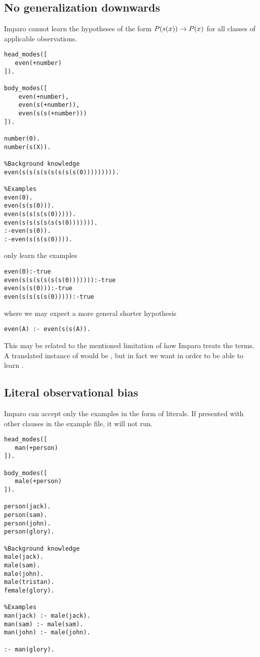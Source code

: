 \subsection{No generalization downwards}
Imparo cannot learn the hypotheses of the form $P(s(x)) \to P(x)$ for all classes of applicable observations.

\begin{lstlisting}
head_modes([
   even(+number)
]).

body_modes([
    even(+number),
    even(s(+number)),
    even(s(s(+number)))
]).

number(0).
number(s(X)).

%Background knowledge
even(s(s(s(s(s(s(s(s(0))))))))).

%Examples
even(0).
even(s(s(0))).
even(s(s(s(s(0))))).
even(s(s(s(s(s(s(0))))))).
:-even(s(0)).
:-even(s(s(s(0)))).
\end{lstlisting}

only learn the examples

\begin{lstlisting}
even(0):-true
even(s(s(s(s(s(s(0))))))):-true
even(s(s(0))):-true
even(s(s(s(s(0))))):-true
\end{lstlisting}

where we may expect a more general shorter hypothesis

\begin{lstlisting}
even(A) :- even(s(s(A)).
\end{lstlisting}
This may be related to the mentioned limitation of how Imparo treats the terms. A translated instance of  would be
, but in fact we want  in order to be able to learn
.

\subsection{Literal observational bias}
Imparo can accept only the examples in the form of literals. If presented with other clauses in the example file, it will not run.

\begin{lstlisting}
head_modes([
   man(+person)
]).

body_modes([
   male(+person)
]).

person(jack).
person(sam).
person(john).
person(glory).

%Background knowledge
male(jack).
male(sam).
male(john).
male(tristan).
female(glory).

%Examples
man(jack) :- male(jack).
man(sam) :- male(sam).
man(john) :- male(john).

:- man(glory).
\end{lstlisting}

